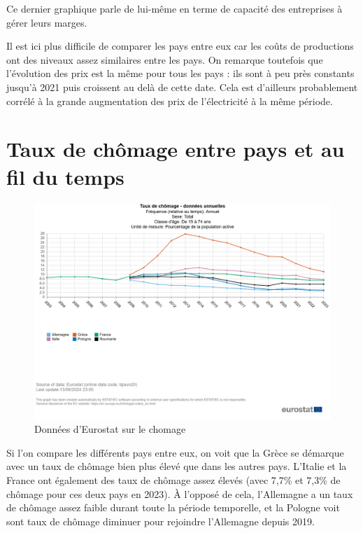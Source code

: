 \documentclass{article}
\begin{document}
Ce dernier graphique parle de lui-même en terme de capacité des entreprises à gérer leurs marges.

Il est ici plus difficile de comparer les pays entre eux car les coûts de productions ont des niveaux assez similaires entre les pays. On remarque toutefois que l'évolution des prix est la même pour tous les pays : ils sont à peu près constants jusqu'à 2021 puis croissent au delà de cette date. Cela est d'ailleurs probablement corrélé à la grande augmentation des prix de l'électricité à la même période.



\clearpage

\section{Taux de chômage entre pays et au fil du temps}
\begin{figure}[H]
  \centering
  \begin{minipage}{0.8\textwidth}
      \centering
      \includegraphics[width=\textwidth]{"chomage.png"}
      \caption{Données d'Eurostat sur le chomage}
  \end{minipage}
\end{figure}

Si l'on compare les différents pays entre eux, on voit que la Grèce se démarque avec un taux de chômage bien plus élevé que dans les autres pays.  L'Italie et la France ont également des taux de chômage assez élevés (avec 7,7\% et 7,3\% de chômage pour ces deux pays en 2023). À l'opposé de cela, l'Allemagne a un taux de chômage assez faible durant toute la période temporelle, et la Pologne voit sont taux de chômage diminuer pour rejoindre l'Allemagne depuis 2019.
\end{document}
